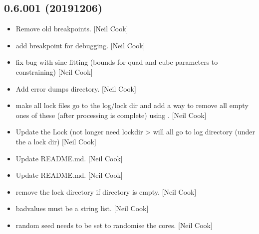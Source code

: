 \documentclass[a4paper,10pt,english]{report}
\begin{document}
\subsection{0.6.001 (2019\sphinxhyphen{}12\sphinxhyphen{}06)}
\label{\detokenize{misc/changelog:id36}}\begin{itemize}
\item {} 
Remove old breakpoints. {[}Neil Cook{]}

\item {} 
 \sphinxhyphen{} add breakpoint for debugging. {[}Neil Cook{]}

\item {} 
 \sphinxhyphen{} fix bug with sinc fitting (bounds for quad and cube
parameters to constraining) {[}Neil Cook{]}

\item {} 
Add error dumps directory. {[}Neil Cook{]}

\item {} 
 \sphinxhyphen{} make all lock files go to the log/lock dir and add a
way to remove all empty ones of these (after processing is complete)
using . {[}Neil Cook{]}

\item {} 
Update the Lock (not longer need lockdir \textendash{}\textgreater{} will all go to log
directory (under the a lock dir) {[}Neil Cook{]}

\item {} 
Update README.md. {[}Neil Cook{]}

\item {} 
Update README.md. {[}Neil Cook{]}

\item {} 
 \sphinxhyphen{} remove the lock directory if directory is empty.
{[}Neil Cook{]}

\item {} 
 \sphinxhyphen{} badvalues must be a string list. {[}Neil Cook{]}

\item {} 
 \sphinxhyphen{} random seed needs to be set to randomise
the cores. {[}Neil Cook{]}

\end{itemize}
\end{document}
